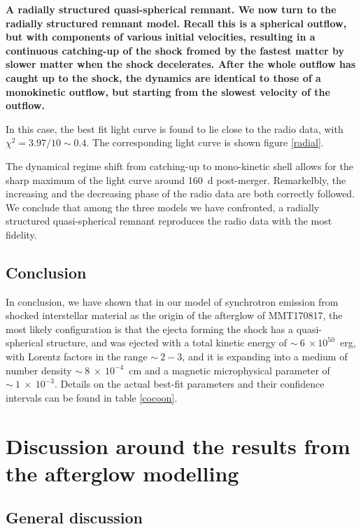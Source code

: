 \bf{A radially structured quasi-spherical remnant. }We now turn to the radially structured remnant model. Recall this is a spherical outflow, but with components of various initial velocities, resulting in a continuous catching-up of the shock fromed by the fastest matter by slower matter when the shock decelerates. After the whole outflow has caught up to the shock, the dynamics are identical to those of a monokinetic outflow, but starting from the slowest velocity of the outflow.

In this case, the best fit light curve is found to lie close to the radio data, with $\chi^2 = 3.97/10 \sim 0.4$. The corresponding light curve is shown figure \ref{radial}.


The dynamical regime shift from catching-up to mono-kinetic shell allows for the sharp maximum of the light curve around 160~d post-merger. Remarkelbly, the increasing and the decreasing phase of the radio data are both correctly followed. We conclude that among the three models we have confronted, a radially structured quasi-spherical remnant reproduces the radio data with the most fidelity.


\subsection{Conclusion}

In conclusion, we have shown that in our model of synchrotron emission from shocked interstellar material as the origin of the afterglow of MMT170817, the most likely configuration is that the ejecta forming the shock has a quasi-spherical structure, and was ejected with a total kinetic energy of $\sim~6~\times 10^{50}$~erg, with Lorentz factors in the range $\sim~2-3$, and it is expanding into a medium of number density $\sim~8~\times~10^{-4}$~cm and a magnetic microphysical parameter of $\sim~1~\times~10^{-3}$. Details on the actual best-fit parameters and their confidence intervals can be found in table \ref{cocoon}.

\section{Discussion around the results from the afterglow modelling}

\subsection{General discussion}

